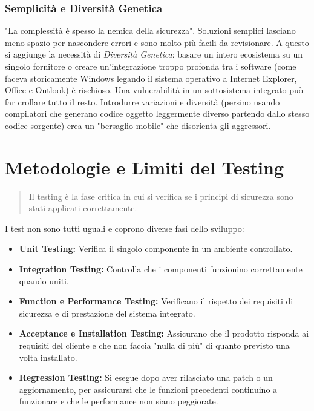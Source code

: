 \documentclass{article}
\begin{document}
\vspace{0.8cm}

\subsubsection*{Semplicità e Diversità Genetica}

"La complessità è spesso la nemica della sicurezza". Soluzioni semplici lasciano meno spazio per nascondere errori e sono molto più facili da revisionare. A questo si aggiunge la necessità di \textit{Diversità Genetica}: basare un intero ecosistema su un singolo fornitore o creare un'integrazione troppo profonda tra i software (come faceva storicamente Windows legando il sistema operativo a Internet Explorer, Office e Outlook) è rischioso. Una vulnerabilità in un sottosistema integrato può far crollare tutto il resto. Introdurre variazioni e diversità (persino usando compilatori che generano codice oggetto leggermente diverso partendo dallo stesso codice sorgente) crea un "bersaglio mobile" che disorienta gli aggressori.

\vspace{0.8cm}

\section*{Metodologie e Limiti del Testing}

\begin{quote}
    Il testing è la fase critica in cui si verifica se i principi di sicurezza sono stati applicati correttamente.
\end{quote}

I test non sono tutti uguali e coprono diverse fasi dello sviluppo:

\begin{itemize}
    \item \textbf{Unit Testing:} Verifica il singolo componente in un ambiente controllato.
    \item \textbf{Integration Testing:} Controlla che i componenti funzionino correttamente quando uniti.
    \item \textbf{Function e Performance Testing:} Verificano il rispetto dei requisiti di sicurezza e di prestazione del sistema integrato.
    \item \textbf{Acceptance e Installation Testing:} Assicurano che il prodotto risponda ai requisiti del cliente e che non faccia "nulla di più" di quanto previsto una volta installato.
    \item \textbf{Regression Testing:} Si esegue dopo aver rilasciato una patch o un aggiornamento, per assicurarsi che le funzioni precedenti continuino a funzionare e che le performance non siano peggiorate.
\end{itemize}
\end{document}
